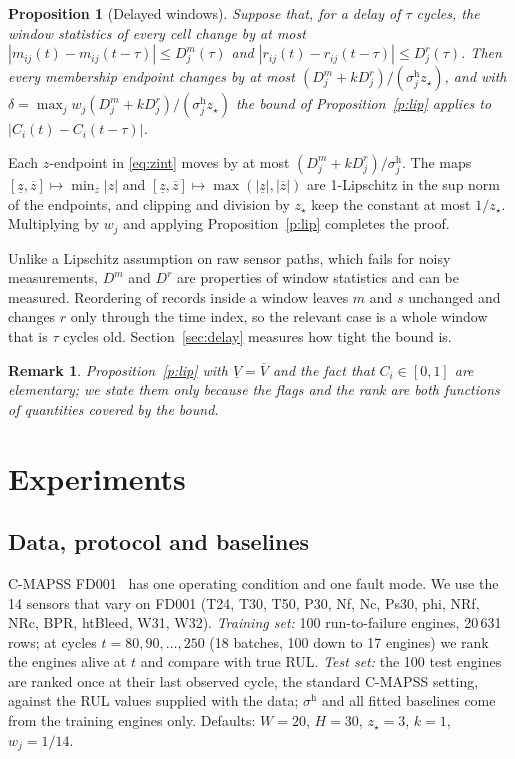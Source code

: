 \documentclass[journal,10pt,twocolumn]{IEEEtran}
\newtheorem{proposition}{Proposition}
\newtheorem{remark}{Remark}
\begin{document}
\begin{proposition}[Delayed windows]
\label{p:delay}
Suppose that, for a delay of $\tau$ cycles, the window statistics of every cell change by at most $|m_{ij}(t)-m_{ij}(t-\tau)|\le D^m_j(\tau)$ and $|r_{ij}(t)-r_{ij}(t-\tau)|\le D^r_j(\tau)$. Then every membership endpoint changes by at most $(D^m_j+kD^r_j)/(\sigma_j^{\mathrm h}z_\star)$, and with $\delta=\max_j w_j(D^m_j+kD^r_j)/(\sigma_j^{\mathrm h}z_\star)$ the bound of Proposition~\ref{p:lip} applies to $|C_i(t)-C_i(t-\tau)|$.
\end{proposition}
\begin{IEEEproof}
Each $z$-endpoint in \eqref{eq:zint} moves by at most $(D^m_j+kD^r_j)/\sigma_j^{\mathrm h}$. The maps $[\underline z,\overline z]\mapsto\min_{z}|z|$ and $[\underline z,\overline z]\mapsto\max(|\underline z|,|\overline z|)$ are 1-Lipschitz in the sup norm of the endpoints, and clipping and division by $z_\star$ keep the constant at most $1/z_\star$. Multiplying by $w_j$ and applying Proposition~\ref{p:lip} completes the proof.
\end{IEEEproof}
Unlike a Lipschitz assumption on raw sensor paths, which fails for noisy measurements, $D^m$ and $D^r$ are properties of window statistics and can be measured. Reordering of records inside a window leaves $m$ and $s$ unchanged and changes $r$ only through the time index, so the relevant case is a whole window that is $\tau$ cycles old. Section~\ref{sec:delay} measures how tight the bound is.

\begin{remark}
Proposition~\ref{p:lip} with $\underline V=\overline V$ and the fact that $C_i\in[0,1]$ are elementary; we state them only because the flags and the rank are both functions of quantities covered by the bound.
\end{remark}

\section{Experiments}
\label{sec:exp}
\subsection{Data, protocol and baselines}
C-MAPSS FD001~\cite{saxena2008} has one operating condition and one fault mode. We use the 14 sensors that vary on FD001 (T24, T30, T50, P30, Nf, Nc, Ps30, phi, NRf, NRc, BPR, htBleed, W31, W32). \emph{Training set:} 100 run-to-failure engines, 20\,631 rows; at cycles $t=80,90,\dots,250$ (18 batches, 100 down to 17 engines) we rank the engines alive at $t$ and compare with true RUL. \emph{Test set:} the 100 test engines are ranked once at their last observed cycle, the standard C-MAPSS setting, against the RUL values supplied with the data; $\sigma^{\mathrm h}$ and all fitted baselines come from the training engines only. Defaults: $W=20$, $H=30$, $z_\star=3$, $k=1$, $w_j=1/14$.
\end{document}
